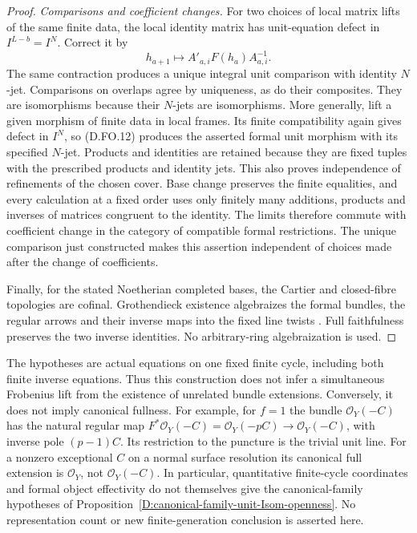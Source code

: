 \begin{proof}
\emph{Comparisons and coefficient changes.}
For two choices of local matrix lifts of the same finite
data, the local identity matrix has unit-equation defect
in $I^{L-b}=I^N$. Correct it by
\[
                 h_{a+1}\longmapsto
             A'_{a,i}F(h_a)A_{a,i}^{-1}.                \tag{D.FO.12}
\]
The same contraction produces a unique integral unit
comparison with identity $N$-jet. Comparisons on overlaps
agree by uniqueness, as do their composites. They are
isomorphisms because their $N$-jets are isomorphisms.
More generally, lift a given morphism of finite data in
local frames. Its finite compatibility again gives
defect in $I^N$, so (D.FO.12) produces the asserted
formal unit morphism with its specified $N$-jet.
Products and identities are retained because they are
fixed tuples with the prescribed products and identity
jets. This also proves independence of refinements of
the chosen cover. Base change preserves the finite
equalities, and every calculation at a fixed order uses
only finitely many additions, products and inverses of
matrices congruent to the identity. The limits therefore
commute with coefficient change in the category of
compatible formal restrictions. The unique comparison
just constructed makes this assertion independent of
choices made after the change of coefficients.

Finally, for the stated Noetherian completed bases,
the Cartier and closed-fibre topologies are cofinal.
Grothendieck existence algebraizes the formal bundles,
the regular arrows and their inverse maps into the
fixed line twists
\citep[Theorem 30.27.1, Tag 088E]{StacksIntrinsicUnitHomD}.
Full faithfulness preserves the two inverse identities.
No arbitrary-ring algebraization is used.
\end{proof}

\begin{remark}
The hypotheses are actual equations on one fixed finite
cycle, including both finite inverse equations. Thus this
construction does not infer a simultaneous Frobenius
lift from the existence of unrelated bundle extensions.
Conversely, it does not imply canonical fullness. For
example, for $f=1$ the bundle $\mathcal O_Y(-C)$ has
the natural regular map
$F^*\mathcal O_Y(-C)=\mathcal O_Y(-pC)\to
\mathcal O_Y(-C)$, with inverse pole $(p-1)C$.
Its restriction to the puncture is the trivial unit line.
For a nonzero exceptional $C$ on a normal surface
resolution its canonical full extension is
$\mathcal O_Y$, not $\mathcal O_Y(-C)$.
In particular, quantitative finite-cycle coordinates and
formal object effectivity do not themselves give the
canonical-family hypotheses of
Proposition~\ref{D:canonical-family-unit-Isom-openness}.
No representation count or new finite-generation
conclusion is asserted here.
\end{remark}
